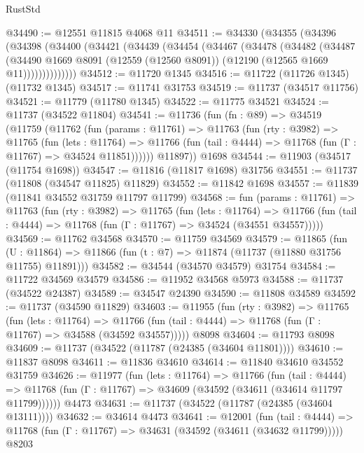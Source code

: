 \begin{lexlean}{RustStd}
\begin{coremodule}
@34490 := @12551 @11815 @4068 @11
@34511 := @34330
    (@34355
      (@34396
        (@34398
          (@34400
            (@34421
              (@34439
                (@34454
                  (@34467
                    (@34478
                      (@34482
                        (@34487
                          (@34490
                            @1669
                            @8091
                            (@12559 (@12560 @8091))
                            (@12190 (@12565 @1669 @11))))))))))))))
@34512 := @11720 @1345
@34516 := @11722 (@11726 @1345) (@11732 @1345)
@34517 := @11741 @31753
@34519 := @11737 (@34517 @11756)
@34521 := @11779 (@11780 @1345)
@34522 := @11775 @34521
@34524 := @11737 (@34522 @11804)
@34541 := @11736
    (fun (fn : @89) =>
    @34519
      (@11759
        (@11762
          (fun (params : @11761) =>
          @11763
            (fun (rty : @3982) =>
            @11765
              (fun (lets : @11764) =>
              @11766 (fun (tail : @4444) => @11768 (fun (Γ : @11767) => @34524 @11851))))))
        @11897))
    @1698
@34544 := @11903 (@34517 (@11754 @1698))
@34547 := @11816 (@11817 @1698) @31756
@34551 := @11737 (@11808 (@34547 @11825) @11829)
@34552 := @11842 @1698
@34557 := @11839 (@11841 @34552 @31759 @11797 @11799)
@34568 := fun (params : @11761) =>
  @11763
    (fun (rty : @3982) =>
    @11765
      (fun (lets : @11764) =>
      @11766 (fun (tail : @4444) => @11768 (fun (Γ : @11767) => @34524 (@34551 @34557)))))
@34569 := @11762 @34568
@34570 := @11759 @34569
@34579 := @11865
    (fun (U : @11864) => @11866 (fun (t : @7) => @11874 (@11737 (@11880 @31756 @11755) @11891)))
@34582 := @34544 (@34570 @34579) @31754
@34584 := @11722 @34569 @34579
@34586 := @11952 @34568 @5973
@34588 := @11737 (@34522 @24387)
@34589 := @34547 @24390
@34590 := @11808 @34589
@34592 := @11737 (@34590 @11829)
@34603 := @11955
    (fun (rty : @3982) =>
    @11765
      (fun (lets : @11764) =>
      @11766 (fun (tail : @4444) => @11768 (fun (Γ : @11767) => @34588 (@34592 @34557)))))
    @8098
@34604 := @11793 @8098
@34609 := @11737 (@34522 (@11787 (@24385 (@34604 @11801))))
@34610 := @11837 @8098
@34611 := @11836 @34610
@34614 := @11840 @34610 @34552 @31759
@34626 := @11977
    (fun (lets : @11764) =>
    @11766
      (fun (tail : @4444) =>
      @11768 (fun (Γ : @11767) => @34609 (@34592 (@34611 (@34614 @11797 @11799))))))
    @4473
@34631 := @11737 (@34522 (@11787 (@24385 (@34604 @13111))))
@34632 := @34614 @4473
@34641 := @12001
    (fun (tail : @4444) => @11768 (fun (Γ : @11767) => @34631 (@34592 (@34611 (@34632 @11799)))))
    @8203

\end{coremodule}
\end{lexlean}
